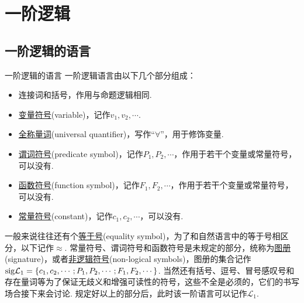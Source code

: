 \documentclass[main.tex]{subfiles}
\begin{document}
\section{一阶逻辑}

\subsection{一阶逻辑的语言}

\begin{definition}{一阶逻辑的语言}
    一阶逻辑语言由以下几个部分组成：
    \begin{itemize}
        \item 连接词和括号，作用与命题逻辑相同.
        \item \uline{变量符号}(variable)，记作\(v_1, v_2, \cdots\).
        \item \uline{全称量词}(universal quantifier)，写作“\(\forall\)”，用于修饰变量.
        \item \uline{谓词符号}(predicate symbol)，记作\(P_1,P_2,\cdots\)，作用于若干个变量或常量符号，可以没有.
        \item \uline{函数符号}(function symbol)，记作\(F_1,F_2,\cdots\)，作用于若干个变量或常量符号，可以没有.
        \item \uline{常量符号}(constant)，记作\(c_1,c_2,\cdots\)，可以没有.
    \end{itemize}
    一般来说往往还有个\uline{等于号}(equality symbol)，为了和自然语言中的等于号相区分，以下记作\(\approx\). \newline
    常量符号、谓词符号和函数符号是未规定的部分，统称为\uline{图册}(signature)，或者\uline{非逻辑符号}(non-logical symbols)，图册的集合记作\({\rm sig}\mathcal{L}_1 = \{ c_1, c_2, \cdots; P_1, P_2, \cdots; F_1, F_2, \cdots \}\). \newline
    当然还有括号、逗号、冒号感叹号和存在量词等为了保证无歧义和增强可读性的符号，这些不全是必须的，它们的书写场合接下来会讨论. \newline
    规定好以上的部分后，此时该一阶语言可以记作\(\mathcal{L}_1\).
\end{definition}
\end{document}
